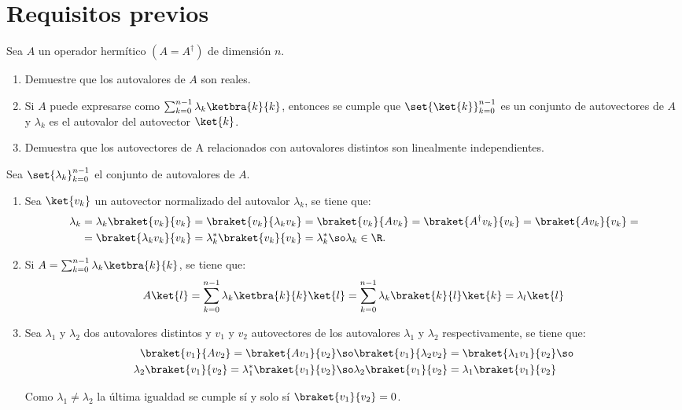 \section{Requisitos previos}

\begin{problem}
Sea $A$ un operador hermítico $(A = A^\dagger)$ de dimensión $n$.
\begin{enumerate}
	\item Demuestre que los autovalores de $A$ son reales.
	\item Si $A$ puede expresarse como $\sum_{k=0}^{n-1} \lambda_k\ketbra{k}{k}$, entonces se cumple que $\set{\ket{k}}_{k=0}^{n-1}$ es un conjunto de autovectores de $A$ y $\lambda_k$ es el autovalor del autovector $\ket{k}$.
	\item Demuestra que los autovectores de A relacionados con autovalores distintos son linealmente independientes.
\end{enumerate}
\end{problem}

\begin{solution}
	Sea $\set{\lambda_k}_{k=0}^{n-1}$ el conjunto de autovalores de $A$.
	\begin{enumerate}
		\item Sea $\ket{v_k}$ un autovector normalizado del autovalor $\lambda_k$, se tiene que:
		\begin{equation*}
			\begin{split}
				\lambda_k &= \lambda_k\braket{v_k}{v_k}= \braket{v_k}{\lambda_k v_k}=\braket{v_k}{Av_k}=\braket{A^\dagger v_k}{v_k}=\braket{A v_k}{v_k}=\\
				&=\braket{\lambda_k v_k}{v_k}=\lambda_k^* \braket{v_k}{v_k}=\lambda_k^* \so \lambda_k\in\R.
			\end{split}
		\end{equation*}
		\item Si $A=\sum_{k=0}^{n-1} \lambda_k\ketbra{k}{k}$, se tiene que:\pendiente
		\begin{equation*}
			A\ket{l}=\sum_{k=0}^{n-1} \lambda_k\ketbra{k}{k}\ket{l}=\sum_{k=0}^{n-1}
			\lambda_k\braket{k}{l}\ket{k}=\lambda_l\ket{l}
		\end{equation*}
		\item Sea $\lambda_1$ y $\lambda_2$ dos autovalores distintos y $v_{1}$ y $v_{2}$ autovectores de los autovalores $\lambda_1$ y $\lambda_2$ respectivamente, se tiene que:
		\begin{equation*}
			\begin{split}
				\braket{v_1}{Av_2}=\braket{A v_1}{v_2}&\so\braket{v_1}{\lambda_2 v_2}=\braket{\lambda_1 v_1}{v_2}\so \\
				\lambda_2\braket{v_1}{v_2}=\lambda_1^* \braket{v_1}{v_2}&\so\lambda_2\braket{v_1}{v_2}=\lambda_1 \braket{v_1}{v_2}
			\end{split}
		\end{equation*}

		Como $\lambda_1\neq\lambda_2$ la última igualdad se cumple sí y solo sí $\braket{v_1}{v_2}=0$.
	\end{enumerate}
\end{solution}

